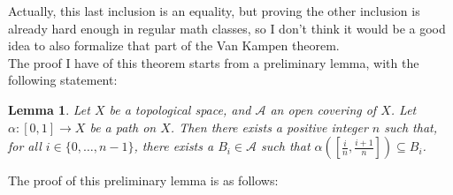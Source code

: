\documentclass[12pt,a4paper]{article}
\newtheorem*{lemma}{Lemma}
\begin{document}
Actually, this last inclusion is an equality, but proving the other inclusion is already hard enough in regular math classes, so I don't think it would be a good idea to also formalize that part of the Van Kampen theorem.
\ \\

The proof I have of this theorem starts from a preliminary lemma, with the following statement: 
\begin{lemma}
Let $X$ be a topological space, and $\mathcal{A}$ an open covering of $X$. Let $\alpha: [0,1] \to X$ be a path on $X$. Then there exists a positive integer $n$ such that, for all $i \in \{0,\ldots,n-1\}$, there exists a 
$B_i \in \mathcal{A}$ such that $\alpha ([\frac{i}{n}, \frac{i+1}{n}]) \subseteq B_i$.
\end{lemma} 

The proof of this preliminary lemma is as follows:
\end{document}
